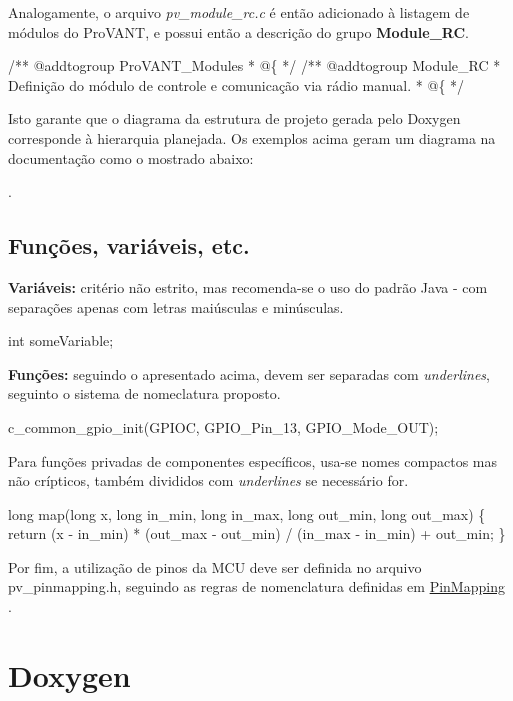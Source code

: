 Analogamente, o arquivo {\itshape pv\+\_\+module\+\_\+rc.\+c} é então adicionado à listagem de módulos do Pro\+V\+A\+NT, e possui então a descrição do grupo {\bfseries Module\+\_\+\+RC}.


\begin{DoxyCode}
\textcolor{comment}{/** @addtogroup ProVANT\_Modules}
\textcolor{comment}{  * @\{}
\textcolor{comment}{  */}
\textcolor{comment}{}
\textcolor{comment}{/** @addtogroup Module\_RC}
\textcolor{comment}{  * Definição do módulo de controle e comunicação via rádio manual.}
\textcolor{comment}{  * @\{}
\textcolor{comment}{  */}
\end{DoxyCode}


Isto garante que o diagrama da estrutura de projeto gerada pelo Doxygen corresponde à hierarquia planejada. Os exemplos acima geram um diagrama na documentação como o mostrado abaixo\+:

.\hypertarget{page_naming_page_naming_subsec_codenaming}{}\subsection{Funções, variáveis, etc.}\label{page_naming_page_naming_subsec_codenaming}
{\bfseries Variáveis\+:} critério não estrito, mas recomenda-\/se o uso do padrão Java -\/ com separações apenas com letras maiúsculas e minúsculas.


\begin{DoxyCode}
\textcolor{keywordtype}{int} someVariable; 
\end{DoxyCode}


{\bfseries Funções\+:} seguindo o apresentado acima, devem ser separadas com {\itshape underlines}, seguinto o sistema de nomeclatura proposto.


\begin{DoxyCode}
c\_common\_gpio\_init(GPIOC, GPIO\_Pin\_13, GPIO\_Mode\_OUT); 
\end{DoxyCode}
 Para funções privadas de componentes específicos, usa-\/se nomes compactos mas não crípticos, também divididos com {\itshape underlines} se necessário for. 
\begin{DoxyCode}
\textcolor{keywordtype}{long} map(\textcolor{keywordtype}{long} x, \textcolor{keywordtype}{long} in\_min, \textcolor{keywordtype}{long} in\_max, \textcolor{keywordtype}{long} out\_min, \textcolor{keywordtype}{long} out\_max) \{
    \textcolor{keywordflow}{return} (x - in\_min) * (out\_max - out\_min) / (in\_max - in\_min) + out\_min;
\} 
\end{DoxyCode}


Por fim, a utilização de pinos da M\+CU deve ser definida no arquivo {\ttfamily pv\+\_\+pinmapping.\+h}, seguindo as regras de nomenclatura definidas em \hyperlink{}{Pin\+Mapping } .\hypertarget{page_naming_page_naming_sec_doxygen}{}\section{Doxygen}\label{page_naming_page_naming_sec_doxygen}

